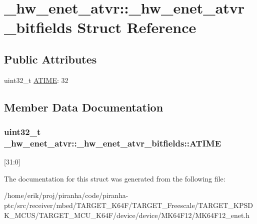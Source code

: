\hypertarget{struct__hw__enet__atvr_1_1__hw__enet__atvr__bitfields}{}\section{\+\_\+hw\+\_\+enet\+\_\+atvr\+:\+:\+\_\+hw\+\_\+enet\+\_\+atvr\+\_\+bitfields Struct Reference}
\label{struct__hw__enet__atvr_1_1__hw__enet__atvr__bitfields}
\subsection*{Public Attributes}
\begin{DoxyCompactItemize}
\item 
uint32\+\_\+t \hyperlink{struct__hw__enet__atvr_1_1__hw__enet__atvr__bitfields_a19a73bade271707b462548eae1700c8a}{A\+T\+I\+ME}\+: 32
\end{DoxyCompactItemize}


\subsection{Member Data Documentation}
\subsubsection[{\texorpdfstring{A\+T\+I\+ME}{ATIME}}]{\setlength{\rightskip}{0pt plus 5cm}uint32\+\_\+t \+\_\+hw\+\_\+enet\+\_\+atvr\+::\+\_\+hw\+\_\+enet\+\_\+atvr\+\_\+bitfields\+::\+A\+T\+I\+ME}\hypertarget{struct__hw__enet__atvr_1_1__hw__enet__atvr__bitfields_a19a73bade271707b462548eae1700c8a}{}\label{struct__hw__enet__atvr_1_1__hw__enet__atvr__bitfields_a19a73bade271707b462548eae1700c8a}
\mbox{[}31\+:0\mbox{]} 

The documentation for this struct was generated from the following file\+:\begin{DoxyCompactItemize}
\item 
/home/erik/proj/piranha/code/piranha-\/ptc/src/receiver/mbed/\+T\+A\+R\+G\+E\+T\+\_\+\+K64\+F/\+T\+A\+R\+G\+E\+T\+\_\+\+Freescale/\+T\+A\+R\+G\+E\+T\+\_\+\+K\+P\+S\+D\+K\+\_\+\+M\+C\+U\+S/\+T\+A\+R\+G\+E\+T\+\_\+\+M\+C\+U\+\_\+\+K64\+F/device/device/\+M\+K64\+F12/M\+K64\+F12\+\_\+enet.\+h\end{DoxyCompactItemize}
